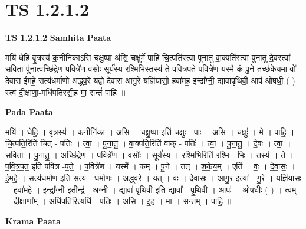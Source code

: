 \documentclass[17pt]{extarticle}
\begin{document}
\section*{ TS 1.2.1.2 }

\textbf{TS 1.2.1.2 } \newline
\textbf{Samhita Paata} \newline

मयि॑ धेहि वृ॒त्रस्य॑ क॒नीनि॑काऽसि चक्षु॒ष्पा अ॑सि॒ चक्षु॑र्मे पाहि चि॒त्पति॑स्त्वा पुनातु वा॒क्पति॑स्त्वा पुनातु दे॒वस्त्वा॑ सवि॒ता पु॑ना॒त्वच्छि॑द्रेण प॒वित्रे॑ण॒ वसोः॒ सूर्य॑स्य र॒श्मिभि॒स्तस्य॑ ते पवित्रपते प॒वित्रे॑ण॒ यस्मै॒ कं पु॒ने तच्छ॑केय॒मा वो॑ देवास ईमहे॒ सत्य॑धर्माणो अद्ध्व॒रे यद्वो॑ देवास आगु॒रे यज्ञि॑यासो॒ हवा॑मह॒ इन्द्रा᳚ग्नी॒ द्यावा॑पृथिवी॒ आप॑ ओषधी॒ ( ) स्त्वं दी॒क्षाणा॒-मधि॑पतिरसी॒ह मा॒ सन्तं॑ पाहि ॥ \newline

\textbf{Pada Paata} \newline

मयि॑ । धे॒हि॒ । वृ॒त्रस्य॑ । क॒नीनि॑का । अ॒सि॒ । च॒क्षु॒ष्पा इति॑ चक्षुः - पाः । अ॒सि॒ । चक्षुः॑ । मे॒ । पा॒हि॒ । चि॒त्पति॒रिति॑ चित् - पतिः॑ । त्वा॒ । पु॒ना॒तु॒ । वा॒क्पति॒रिति॑ वाक् - पतिः॑ । त्वा॒ । पु॒ना॒तु॒ । दे॒वः । त्वा॒ । स॒वि॒ता । पु॒ना॒तु॒ । अच्छि॑द्रेण । प॒वित्रे॑ण । वसोः᳚ । सूर्य॑स्य । र॒श्मिभि॒रिति॑ र॒श्मि - भिः॒ । तस्य॑ । ते॒ । प॒वि॒त्र॒प॒त॒ इति॑ पवित्र -प॒ते॒ । प॒वित्रे॑ण । यस्मै᳚ । कम् । पु॒ने । तत् । श॒के॒य॒म् । एति॑ । वः॒ । दे॒वा॒सः॒ । ई॒म॒हे॒ । सत्य॑धर्माण॒ इति॒ सत्य॑ - ध॒र्मा॒णः॒ । अ॒द्ध्व॒रे । यत् । वः॒ । दे॒वा॒सः॒ । आ॒गु॒र इत्या᳚ - गु॒रे । यज्ञि॑यासः । हवा॑महे । इन्द्रा᳚ग्नी॒ इतीन्द्र॑ - अ॒ग्नी॒ । द्यावा॑ पृथिवी॒ इति॒ द्यावा᳚ - पृ॒थि॒वी॒ । आपः॑ । ओ॒ष॒धीः॒ ( ) । त्वम् । दी॒क्षाणा᳚म् । अधि॑पति॒रित्यधि॑ - प॒तिः॒ । अ॒सि॒ । इ॒ह । मा॒ । सन्त᳚म् । पा॒हि॒ ॥  \newline


\textbf{Krama Paata} \newline
\end{document}
